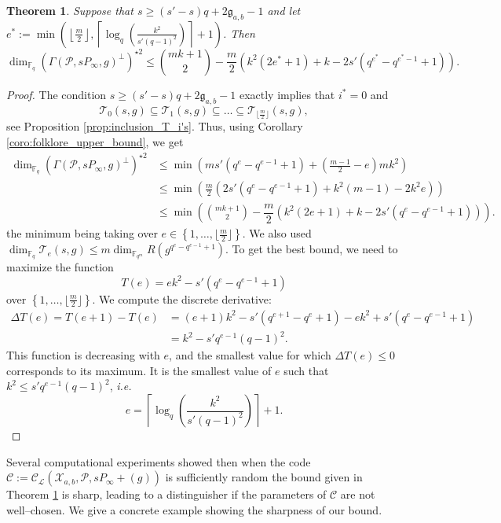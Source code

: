 \documentclass[a4paper]{amsart}
\newtheorem{thm}{Theorem}[section]
\theoremstyle{definition}
\theoremstyle{remark}
\newcommand{\calP}{\mathcal{P}}
\newcommand{\calL}{\mathcal{L}}
\newcommand{\calC}{\mathcal{C}}
\newcommand{\calT}{\mathcal{T}}
\newcommand{\calX}{\mathcal{X}}
\newcommand{\fqm}{\mathbb{F}_{q^m}}
\newcommand{\fq}{\mathbb{F}_{q}}
\newcommand{\set}[1]{\left\{#1\right\}}
\begin{document}
\begin{thm} \label{thm:bound_with_T_i's_inclusion} 
Suppose that $s \geq (s'-s)q+2\mathfrak{g}_{a,b}-1$ and let $e^* := \min\left(\left\lfloor \frac{m}{2} \right\rfloor, \left\lceil \log_q\left(\frac{k^2}{s'(q-1)^2}\right)\right\rceil+1\right)$. Then
$$\dim_{\fq} (\Gamma(\calP,sP_\infty,g)^{\perp})^{\star 2}\leq \binom{mk+1}{2} - \dfrac{m}{2}(k^2(2e^*+1)+k-2s'(q^{e^*}-q^{e^*-1}+1)). $$
\end{thm}

\begin{proof}
The condition $s \geq (s'-s)q+2\mathfrak{g}_{a,b}-1$ exactly implies that $i^*=0$ and $$\calT_0(s,g) \subseteq \calT_1(s,g) \subseteq \dots \subseteq \calT_{\lfloor \frac{m}{2}\rfloor}(s,g),$$ 
see Proposition \ref{prop:inclusion_T_i's}. Thus, using Corollary \ref{coro:folklore_upper_bound}, we get
\begin{align*}
        \dim_{\fq} (\Gamma(\calP,sP_\infty,g)^{\perp})^{\star 2}
        & \leq \min \left(ms'(q^e-q^{e-1}+1) + \left( \frac{m-1}{2} -e \right)mk^2 \right)\\
        & \leq \min \left(\frac{m}{2}\left(2s'(q^e-q^{e-1}+1)+k^2(m-1)-2k^2e  \right)\right) \\
        & \leq \min\left(\binom{mk+1}{2} - \dfrac{m}{2}\left(k^2(2e+1)+k-2s'(q^e-q^{e-1}+1)\right)\right).
\end{align*}
the minimum being taking over $e \in \set{1,\dots,\lfloor \frac{m}{2} \rfloor}$. We also used $\dim_{\fq}\calT_e(s,g) \leq m \dim_{\fqm} R(g^{q^e-q^{e-1}+1})$.
To get the best bound, we need to maximize the function
$$T(e) = ek^2-s'(q^e-q^{e-1}+1)$$
over $\set{1,\dots,\lfloor \frac{m}{2} \rfloor}$.
We compute the discrete derivative:
\begin{align*}
    \Delta T(e) = T(e+1)-T(e) &= (e+1)k^2- s'(q^{e+1}-q^e+1) - ek^2 + s'(q^e-q^{e-1}+1) \\
                              &= k^2 - s'q^{e-1}(q-1)^2.
\end{align*}
This function is decreasing with $e$, and the smallest value for which $\Delta T(e) \leq 0$ corresponds to its maximum. It is the smallest value of $e$ such that $k^2 \leq s'q^{e-1}(q-1)^2$, \emph{i.e.}
$$e =  \left\lceil \log_q\left(\dfrac{k^2}{s'(q-1)^2}\right)\right\rceil+1.$$
\end{proof}

Several computational experiments showed then when the code $\calC:=\calC_{\calL}(\calX_{a,b},\calP,sP_\infty+(g))$ is sufficiently random the bound given in Theorem \ref{thm:bound_with_T_i's_inclusion} is sharp, leading to a distinguisher if the parameters of $\calC$ are not well--chosen. We give a concrete example showing the sharpness of our bound.
\end{document}
